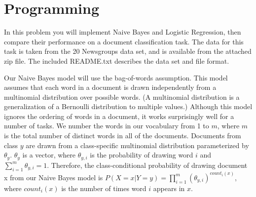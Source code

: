 \documentclass{article}
\theoremstyle{definition}
\theoremstyle{definition}
\theoremstyle{remark}
\begin{document}
\section*{Programming}
In this problem you will implement Naive Bayes and Logistic Regression, then compare their performance on a
document classification task. The data for this task is taken from the 20 Newsgroups data set, and is available
from the attached zip file. The included README.txt describes the data set and file format.

Our Naive Bayes model will use the bag-of-words assumption. This model assumes that each word in a
document is drawn independently from a multinomial distribution over possible words. (A multinomial
distribution is a generalization of a Bernoulli distribution to multiple values.) Although this model ignores
the ordering of words in a document, it works surprisingly well for a number of tasks. We number the words
in our vocabulary from 1 to $m$, where $m$ is the total number of distinct words in all of the documents.
Documents from class $y$ are drawn from a class-specific multinomial distribution parameterized by $\theta_y$. $\theta_y$ is
a vector, where $\theta_{y,i}$ is the probability of drawing word $i$ and $\sum_{i=1}^m \theta_{y,i}=1$.
Therefore, the class-conditional probability of drawing document x from our Naive Bayes model is
$P(X = x|Y = y) = \prod_{i=1}^m (\theta_{y,i})^{count_i(x)}$, where $count_i(x)$ is the number of times word $i$ appears in $x$.
\end{document}
